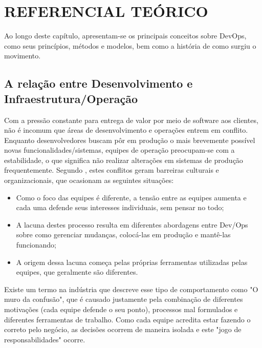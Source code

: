 \documentclass[twoside,english,brazilian]{UNISINOSartigo}
\begin{document}
\section{REFERENCIAL TEÓRICO}
	Ao longo deste capítulo, apresentam-se os principais conceitos sobre DevOps, como seus princípios, métodos e modelos, bem como a história de como surgiu o movimento.

\subsection{A relação entre Desenvolvimento  e Infraestrutura/Operação}

Com a pressão constante para entrega de valor por meio de software aos clientes, não é incomum que áreas de desenvolvimento e operações entrem em conflito. Enquanto desenvolvedores buscam pôr em produção o mais brevemente possível novas funcionalidades/sistemas, equipes de operação preocupam-se com a estabilidade, o que significa não realizar alterações em sistemas de produção frequentemente.
Segundo , estes conflitos geram barreiras culturais e organizacionais, que ocasionam as seguintes situações:

\begin{itemize}
\item Como o foco das equipes é diferente, a tensão entre as equipes aumenta e cada uma defende seus interesses individuais, sem pensar no todo;
\item A lacuna destes processo resulta em diferentes abordagens entre Dev/Ops sobre como gerenciar mudanças, colocá-las em produção e mantê-las funcionando;
\item  A origem dessa lacuna começa pelas próprias ferramentas utilizadas pelas equipes, que geralmente são diferentes.
\end{itemize}

Existe um termo na indústria que descreve esse tipo de comportamento como "O muro da confusão", que é causado justamente pela combinação de diferentes motivações (cada equipe defende o seu ponto), processos mal formulados e diferentes ferramentas de trabalho. Como cada equipe acredita estar fazendo o correto pelo negócio, as decisões ocorrem de maneira isolada e este "jogo de responsabilidades" ocorre.
% 
% 
\end{document}

